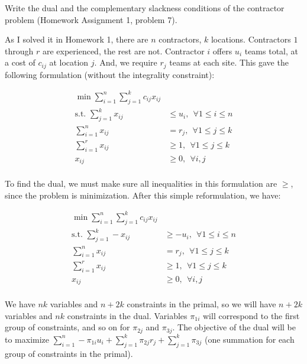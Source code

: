 \documentclass[fleqn]{homework}
\begin{document}
  \begin{problem}{4}
    \begin{question}
      Write the dual and the complementary slackness conditions of the
      contractor problem (Homework Assignment 1, problem 7).
    \end{question}

    As I solved it in Homework 1, there are $n$ contractors, $k$ locations.
    Contractors $1$ through $r$ are experienced, the rest are not.  Contractor
    $i$ offers $u_i$ teams total, at a cost of $c_{ij}$ at location $j$.  And,
    we require $r_j$ teams at each site.  This gave the following formulation
    (without the integrality constraint):

    \begin{align*}
      \min \sum_{i=1}^n \sum_{j=1}^k c_{ij} x_{ij} & \\
      \text{s.t. } \sum_{j=1}^k x_{ij} &\leq u_i, \:\: \forall 1 \le i \le n \\
      \sum_{i=1}^n x_{ij} &= r_j, \:\: \forall 1 \le j \le k \\
      \sum_{i=1}^r x_{ij} &\geq 1, \:\: \forall 1 \le j \le k \\
      x_{ij} &\geq 0, \:\: \forall i,j \\
    \end{align*}

    To find the dual, we must make sure all inequalities in this formulation are
    $\ge$, since the problem is minimization.  After this simple reformulation,
    we have:

    \begin{align*}
      \min \sum_{i=1}^n \sum_{j=1}^k c_{ij} x_{ij} & \\
      \text{s.t. } \sum_{j=1}^k -x_{ij} &\ge -u_i, \:\: \forall 1 \le i \le n \\
      \sum_{i=1}^n x_{ij} &= r_j, \:\: \forall 1 \le j \le k \\
      \sum_{i=1}^r x_{ij} &\geq 1, \:\: \forall 1 \le j \le k \\
      x_{ij} &\geq 0, \:\: \forall i,j \\
    \end{align*}

    We have $nk$ variables and $n+2k$ constraints in the primal, so we will have
    $n+2k$ variables and $nk$ constraints in the dual.  Variables $\pi_{1i}$
    will correspond to the first group of constraints, and so on for $\pi_{2j}$
    and $\pi_{3j}$.  The objective of the dual will be to maximize
    $\sum_{i=1}^n -\pi_{1i} u_i + \sum_{j=1}^k \pi_{2j} r_j + \sum_{j=1}^k
    \pi_{3j}$ (one summation for each group of constraints in the primal).


\end{problem}
\end{document}
